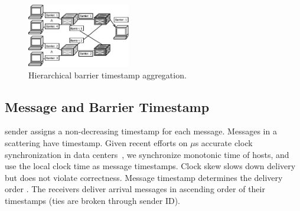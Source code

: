 




\begin{figure}[t]
	\centering
	\includegraphics[width=0.4\textwidth]{images/hierarchical_merge.pdf}
	\caption{Hierarchical barrier timestamp aggregation.} %
	\label{fig:hierarchical_merge}
\end{figure}


\subsection{Message and Barrier Timestamp}
\label{sec:loss-free}

\sys sender assigns a non-decreasing timestamp for each message. Messages in a scattering have  timestamp.
Given recent efforts on $\mu$s accurate clock synchronization in data centers~\cite{correll2005design,lee2016globally,geng2018exploiting,li2020sundial}, we synchronize monotonic time of hosts, and use the local clock time as message timestamps.
Clock skew slows down delivery but does not violate correctness.
Message timestamp determines the delivery order .
The receivers deliver arrival messages in ascending order of their timestamps (ties are broken through sender ID).

